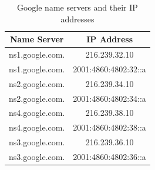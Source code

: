 \documentclass[eng]{class}
\begin{document}
\begin{table}[H]
    \centering
    \footnotesize
    \begin{tabular}{|c|c|}
        \hline
        \linewidth=0cm
        Name Server     & IP Address           \\
        \hline
        ns1.google.com. & 216.239.32.10        \\
        ns1.google.com. & 2001:4860:4802:32::a \\
        ns2.google.com. & 216.239.34.10        \\
        ns2.google.com. & 2001:4860:4802:34::a \\
        ns4.google.com. & 216.239.38.10        \\
        ns4.google.com. & 2001:4860:4802:38::a \\
        ns3.google.com. & 216.239.36.10        \\
        ns3.google.com. & 2001:4860:4802:36::a \\
        \hline
    \end{tabular}
    \caption{Google name servers and their IP addresses}
    \label{tab-5}
\end{table}
\end{document}
